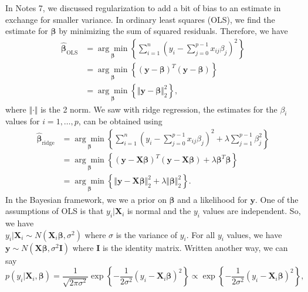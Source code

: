 \documentclass[11pt]{article}
\begin{document}
\newpage


In Notes 7, we discussed regularization to add a bit of bias to an estimate in exchange for smaller variance. In ordinary least squares (OLS), we find the estimate for $\boldsymbol{\beta}$ by minimizing the sum of squared residuals. Therefore, we have 
\begin{align*}
\hat{\boldsymbol{\beta}}_{\text{OLS}}&=\underset{\boldsymbol{\beta}}{\arg\min}\left\{\sum_{i=1}^{n}\left(y_i-\sum_{j=0}^{p-1}x_{ij}\beta_j\right)^2\right\}\\
&=\underset{\boldsymbol{\beta}}{\arg\min}\left\{(\boldsymbol{y}-\boldsymbol{\beta})^T(\boldsymbol{y}-\boldsymbol{\beta})\right\}\\
&=\underset{\boldsymbol{\beta}}{\arg\min}\left\{\Vert\boldsymbol{y}-\boldsymbol{\beta}\Vert^2_2\right\},
\end{align*}
where $\Vert\cdot\Vert$ is the 2 norm. We saw with ridge regression, the estimates for the $\beta_i$ values for $i=1,\dots,p$, can be obtained using
\begin{align*}
\hat{\boldsymbol{\beta}}_{\text{ridge}}&=\underset{\boldsymbol{\beta}}{\arg\min}\left\{\sum_{i=1}^{n}\left(y_i-\sum_{j=0}^{p-1}x_{ij}\beta_j\right)^2+\lambda\sum_{j=1}^{p-1}\beta_j^2\right\}\\
&=\underset{\boldsymbol{\beta}}{\arg\min}\left\{(\boldsymbol{y}-\mathbf{X}\boldsymbol{\beta})^T(\boldsymbol{y}-\mathbf{X}\boldsymbol{\beta})+\lambda\boldsymbol{\beta}^T\boldsymbol{\beta}\right\}\\
&=\underset{\boldsymbol{\beta}}{\arg\min}\left\{\Vert\boldsymbol{y}-\mathbf{X}\boldsymbol{\beta}\Vert^2_2 + \lambda \Vert \boldsymbol{\beta}\Vert_2^2\right\}.
\end{align*}
In the Bayesian framework, we we a prior on $\boldsymbol{\beta}$ and a likelihood for $\boldsymbol{y}$. One of the assumptions of OLS is that $y_i|\mathbf{X}_i$ is normal and the $y_i$ values are independent. So, we have \\
$y_i|\mathbf{X}_i\sim N(\mathbf{X}_i\boldsymbol{\beta}, \sigma^2)$ where $\sigma$ is the variance of $y_i$. For all $y_i$ values, we have $\boldsymbol{y}\sim N(\mathbf{X}\boldsymbol{\beta}, \sigma^2 \mathbf{I})$ where $ \mathbf{I}$ is the identity matrix. Written another way, we can say 
$$
p(y_i|\mathbf{X}_i, \boldsymbol{\beta}) = \dfrac{1}{\sqrt{2\pi\sigma^2}}\exp\left\{-\frac{1}{2\sigma^2}(y_i-\mathbf{X}_i\boldsymbol{\beta})^2 \right\}\propto \exp\left\{-\frac{1}{2\sigma^2}(y_i-\mathbf{X}_i\boldsymbol{\beta})^2 \right\},
$$
\end{document}
